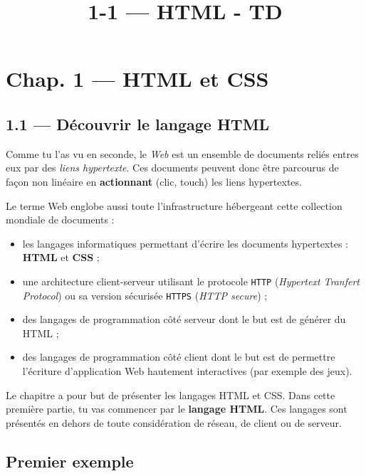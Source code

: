 \documentclass[a4paper,17pt]{extarticle}
\title{1-1 --- HTML - TD}
\providecommand{\tightlist}{%
      \setlength{\itemsep}{0pt}\setlength{\parskip}{0pt}}
\begin{document}
    
    

    
    

    
    \hypertarget{chap.-1-html-et-css}{%
\section{Chap. 1 --- HTML et CSS}\label{chap.-1-html-et-css}}

\hypertarget{duxe9couvrir-le-langage-html}{%
\subsection{1.1 --- Découvrir le langage
HTML}\label{duxe9couvrir-le-langage-html}}

    Comme tu l'as vu en seconde, le \emph{Web} est un ensemble de documents
reliés entres eux par des \emph{liens hypertexte}. Ces documents peuvent
donc être parcourus de façon non linéaire en \textbf{actionnant} (clic,
touch) les liens hypertextes.

Le terme Web englobe aussi toute l'infrastructure hébergeant cette
collection mondiale de documents :

\begin{itemize}
\tightlist
\item
  les langages informatiques permettant d'écrire les documents
  hypertextes : \textbf{HTML} et \textbf{CSS} ;
\item
  une architecture client-serveur utilisant le protocole \texttt{HTTP}
  (\emph{Hypertext Tranfert Protocol}) ou sa version sécurisée
  \texttt{HTTPS} (\emph{HTTP secure}) ;
\item
  des langages de programmation côté serveur dont le but est de générer
  du HTML ;
\item
  des langages de programmation côté client dont le but est de permettre
  l'écriture d'application Web hautement interactives (par exemple des
  jeux).
\end{itemize}
\begin{remarque}
    Le chapitre a pour but de présenter les langages HTML et CSS. Dans cette
première partie, tu vas commencer par le \textbf{langage HTML}. Ces
langages sont présentés en dehors de toute considération de réseau, de
client ou de serveur.

            \end{remarque}
    \hypertarget{premier-exemple}{%
\subsection{Premier exemple}\label{premier-exemple}}
\end{document}

